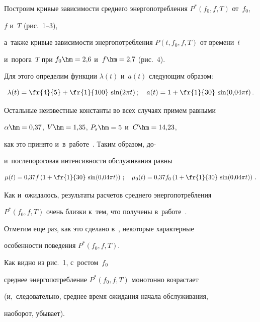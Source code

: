 Построим кривые зависимости среднего энергопотребления $P^*(f_0,f,T)$ от~$f_0$, 

$f$ и~$T$ (рис.~1--3),

а~также кривые зависимости энергопотребления $P(t,f_0,f,T)$ от времени~$t$ 

и~порога~$T$ при $f_0\hm=2{,}6$ и~$f\hm=2{,}7$ (рис.~4).

Для этого определим функции $\lambda(t)$ и~$a(t)$ следующим образом:

\begin{equation*}

\lambda(t) = \fr{4}{5}+ \fr{1}{100}\, \sin(2{\pi} t)\,;

\quad

a(t)=1+\fr{1}{30} \,\sin(0{,}04\pi t)\,.

\end{equation*}

Остальные неизвестные константы во всех случаях примем равными 

$\alpha\hm=0{,}37$, $V\hm=1{,}35$, $P_s\hm=5$ и~$C\hm=14{,}23$,

как это принято и~в~работе~\cite{a2}. Таким образом, до- 

и~послепороговая интенсивности обслуживания равны

\begin{equation*}

\mu(t)=0{,}37 f \left (1+\fr{1}{30}\, \sin(0{,}04\pi t) \right )\,;

\quad

\mu_0(t)=0{,}37 f_0 \left (1+\fr{1}{30}\, \sin(0{,}04\pi t) \right )\,.

\end{equation*}



Как и~ожидалось, результаты расчетов среднего энергопотребления

$P^*(f_0,f,T)$ очень близки к~тем, что получены в~работе~\cite{a2}.

Отметим еще раз, как это сделано в~\cite{a2}, некоторые характерные

особенности поведения $P^*(f_0,f,T)$. 

Как видно из рис.~1, с~ростом~$f_0$ 

среднее энергопотребление $P^*(f_0,f,T)$ монотонно возрастает

(и,~следовательно, среднее время ожидания начала обслуживания,

наоборот, убывает). 

